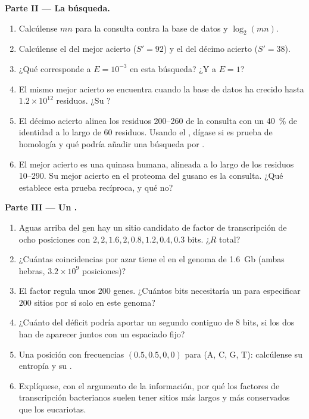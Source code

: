 \begin{problem}
\medskip
\noindent\textbf{Parte II --- La búsqueda.}
\begin{enumerate}[resume]
  \item Calcúlense $mn$ para la consulta contra la base de datos y
        $\log_{2}(mn)$.
  \item Calcúlense el  del mejor acierto ($S' = 92$) y el del
        décimo acierto ($S' = 38$).
  \item ¿Qué  corresponde a $E = 10^{-3}$ en esta
        búsqueda? ¿Y a $E = 1$?
  \item El mismo mejor acierto se encuentra cuando la base de datos ha
        crecido hasta $1.2\times 10^{12}$ residuos. ¿Su ?
  \item El décimo acierto alinea los residuos 200--260 de la consulta
        con un \qty{40}{\%} de identidad a lo largo de $60$ residuos.
        Usando el , dígase si es prueba de homología y qué podría
        añadir una búsqueda por .
  \item El mejor acierto es una quinasa humana, alineada a lo largo de
        los residuos 10--290. Su mejor acierto en el proteoma del gusano
        es la consulta. ¿Qué establece esta prueba recíproca, y qué no?
\end{enumerate}

\medskip
\noindent\textbf{Parte III --- Un .}
\begin{enumerate}[resume]
  \item Aguas arriba del gen hay un sitio candidato de factor de
        transcripción de ocho posiciones con 
        $2, 2, 1.6, 2, 0.8, 1.2, 0.4, 0.3$ bits. ¿$R$ total?
  \item ¿Cuántas coincidencias por azar tiene el  en el genoma de
        \qty{1.6}{Gb} (ambas hebras, $3.2\times 10^{9}$ posiciones)?
  \item El factor regula unos $200$ genes. ¿Cuántos bits necesitaría un
         para especificar $200$ sitios por sí solo en este genoma?
  \item ¿Cuánto del déficit podría aportar un segundo  contiguo de
        $8$ bits, si los dos han de aparecer juntos con un espaciado
        fijo?
  \item Una posición con frecuencias $(0.5, 0.5, 0, 0)$ para (A, C, G,
        T): calcúlense su entropía y su .
  \item Explíquese, con el argumento de la información, por qué los
        factores de transcripción bacterianos suelen tener sitios más
        largos y más conservados que los eucariotas.
\end{enumerate}


\end{problem}
